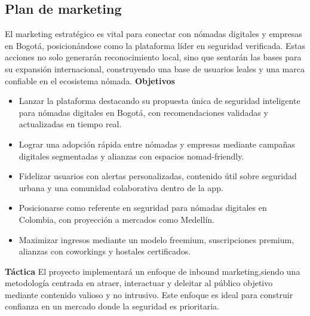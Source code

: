\subsection*{Plan de marketing}
El marketing estratégico es vital para conectar con nómadas digitales y empresas en Bogotá, posicionándose como la plataforma líder en seguridad verificada. Estas acciones no solo generarán reconocimiento local, sino que sentarán las bases para su expansión internacional, construyendo una base de usuarios leales y una marca confiable en el ecosistema nómada.
\textbf{Objetivos}
\begin{itemize}
    \item Lanzar la plataforma destacando su propuesta única de seguridad inteligente para nómadas digitales en Bogotá, con recomendaciones validadas y actualizadas en tiempo real.
    \item Lograr una adopción rápida entre nómadas y empresas mediante campañas digitales segmentadas y alianzas con espacios nomad-friendly.
    \item Fidelizar usuarios con alertas personalizadas, contenido útil sobre seguridad urbana y una comunidad colaborativa dentro de la app.
    \item Posicionarse como referente en seguridad para nómadas digitales en Colombia, con proyección a mercados como Medellín.
    \item Maximizar ingresos mediante un modelo freemium, suscripciones premium, alianzas con coworkings y hostales certificados.

\end{itemize}

\textbf{Táctica}
El proyecto implementará un enfoque de inbound marketing,siendo una metodología centrada en atraer, interactuar y deleitar al público objetivo mediante contenido valioso y no intrusivo. Este enfoque es ideal para construir confianza en un mercado donde la seguridad es prioritaria.


